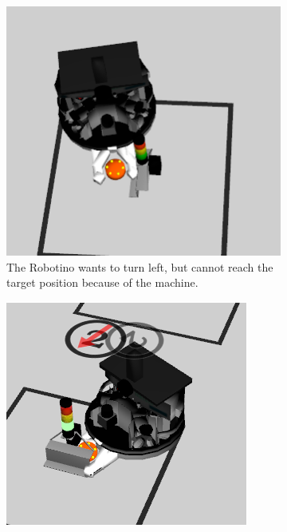 \begin{figure}
  \centering
  \begin{subfigure}[b]{0.38\textwidth}
    \includegraphics[width=\textwidth, height=\textwidth]{pics/bad_performance_eindhoven_no_reset}
    \caption{The Robotino wants to turn left, but cannot reach the target position because of the machine.}
    \label{fig:fails_stuck}
  \end{subfigure}
  \begin{subfigure}[b]{0.38\textwidth}
    \includegraphics[width=\textwidth, height=\textwidth]{pics/wrong_local_bad_angle}

\end{subfigure}
\end{figure}
